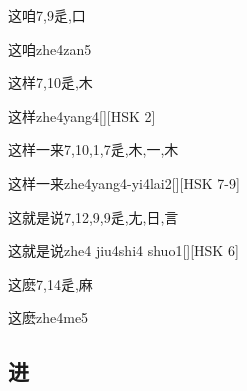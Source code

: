 \begin{Entry}{这咱}{7,9}{⾡,⼝}
  \begin{Phonetics}{这咱}{zhe4zan5}
  \end{Phonetics}
\end{Entry}

\begin{Entry}{这样}{7,10}{⾡,⽊}
  \begin{Phonetics}{这样}{zhe4yang4}[][HSK 2]
  \end{Phonetics}
\end{Entry}

\begin{Entry}{这样一来}{7,10,1,7}{⾡,⽊,⼀,⽊}
  \begin{Phonetics}{这样一来}{zhe4yang4-yi4lai2}[][HSK 7-9]
  \end{Phonetics}
\end{Entry}

\begin{Entry}{这就是说}{7,12,9,9}{⾡,⼪,⽇,⾔}
  \begin{Phonetics}{这就是说}{zhe4 jiu4shi4 shuo1}[][HSK 6]
  \end{Phonetics}
\end{Entry}

\begin{Entry}{这麽}{7,14}{⾡,⿇}
  \begin{Phonetics}{这麽}{zhe4me5}
  \end{Phonetics}
\end{Entry}

\subsection*{进}

